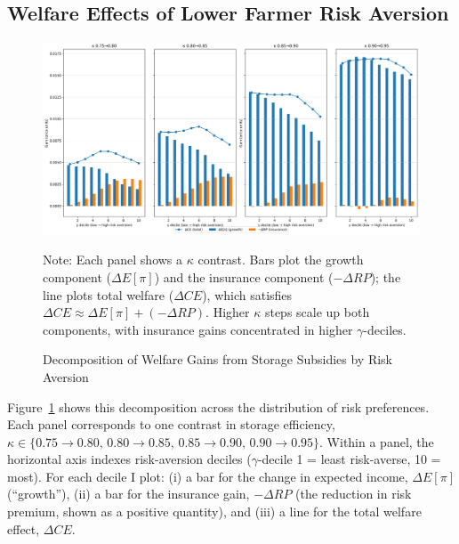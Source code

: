 \subsection{Welfare Effects of Lower Farmer Risk Aversion}


\begin{figure}[ht!]
    \centering
    \includegraphics[width=\linewidth]{model_figures/storage_subsidy_gain_decomposition.png}
    \caption{Decomposition of Welfare Gains from Storage Subsidies by Risk Aversion}
    \label{fig:storage_subsidy_gain_decomposition}
    \begin{tablenotes}
    \footnotesize
    \item Note: Each panel shows a $\kappa$ contrast. Bars plot the growth component ($\Delta E[\pi]$) and the insurance component ($- \Delta RP$); the line plots total welfare ($\Delta CE$), which satisfies $\Delta CE \approx \Delta E[\pi] + (- \Delta RP)$. Higher $\kappa$ steps scale up both components, with insurance gains concentrated in higher $\gamma$-deciles.
    \end{tablenotes}
\end{figure}


Figure~\ref{fig:storage_subsidy_gain_decomposition} shows this decomposition across the distribution of risk preferences. Each panel corresponds to one contrast in storage efficiency, $\kappa \in \{0.75\to0.80,\,0.80\to0.85,\,0.85\to0.90,\,0.90\to0.95\}$. Within a panel, the horizontal axis indexes risk-aversion deciles ($\gamma$-decile 1 = least risk-averse, 10 = most). For each decile I plot: (i) a bar for the change in expected income, $\Delta E[\pi]$ (``growth''), (ii) a bar for the insurance gain, $-\Delta RP$ (the reduction in risk premium, shown as a positive quantity), and (iii) a line for the total welfare effect, $\Delta CE$.

